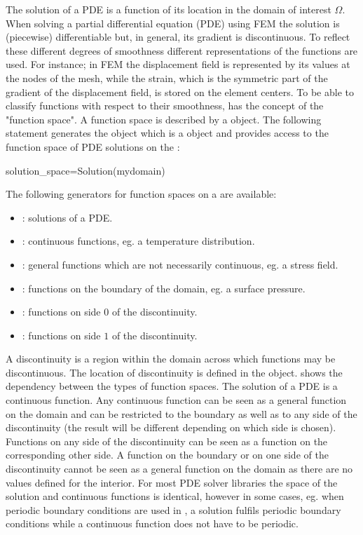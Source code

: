The solution of a PDE is a function of its location in the domain of interest $\Omega$. 
When solving a partial differential equation  (PDE) using FEM
the solution is (piecewise) differentiable but, in general, its gradient
is discontinuous. To reflect these different degrees of smoothness different
representations of the functions are used. For instance; in FEM
the displacement field is represented by its values at the nodes of the mesh, while the 
strain, which is the symmetric part of the gradient of the displacement field, is stored on the 
element centers. To be able to classify functions with respect to their smoothness, \escript has the
concept of the "function space". A function space is described by a \FunctionSpace object.
The following statement generates the object  which is 
a \FunctionSpace object and provides access to the function space of 
PDE solutions on the \Domain {}:
\begin{python}
solution_space=Solution(mydomain)
\end{python}
The following generators for function spaces on a \Domain {} are available: 
\begin{itemize}
\item {}: solutions of a PDE.  
\item {}: continuous functions, eg. a temperature distribution.
\item {}: general functions which are not necessarily continuous, eg. a stress field.
\item {}: functions on the boundary of the domain, eg. a surface pressure.
\item {}: functions on side $0$ of the discontinuity. 
\item {}: functions on side $1$ of the discontinuity.
\end{itemize}
A discontinuity  is a region within the domain across which functions may be discontinuous.  
The location of discontinuity is defined in the \Domain object.
 shows the dependency between the types of function spaces. 
The solution of a PDE is a continuous function. Any continuous function can be seen as a general function
on the domain and can be restricted to the boundary as well as to any side of the 
discontinuity (the result will be different depending on 
which side is chosen). Functions on any side of the  
discontinuity can be seen as a function on the corresponding other side. 
A function on the boundary or on one side of
the discontinuity cannot be seen as a general function on the domain as there are no values 
defined for the interior. For most PDE solver libraries
the space of the solution and continuous functions is identical, however in some cases, eg.
when periodic boundary conditions are used in \finley, a solution 
fulfils periodic boundary conditions while a continuous function does not have to be periodic.
   
